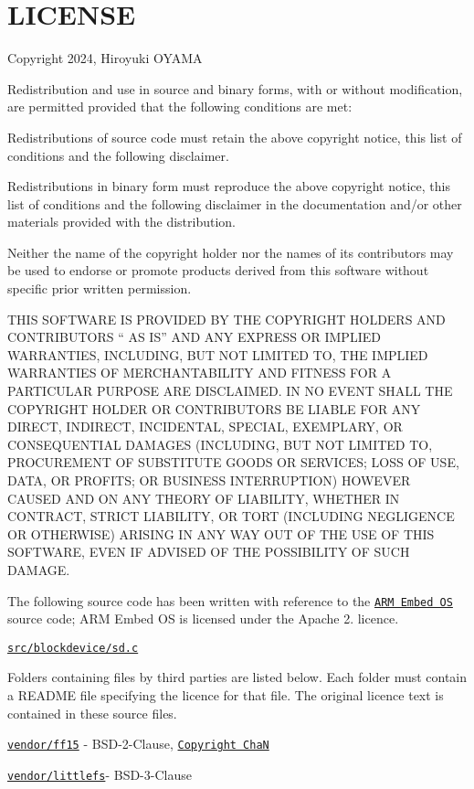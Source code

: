 \chapter{LICENSE }
\hypertarget{md_lib_2pico-vfs-_r_e_g_i-_local_2_l_i_c_e_n_s_e}{}\label{md_lib_2pico-vfs-_r_e_g_i-_local_2_l_i_c_e_n_s_e}
Copyright 2024, Hiroyuki OYAMA

Redistribution and use in source and binary forms, with or without modification, are permitted provided that the following conditions are met\+:


\begin{DoxyItemize}
\item Redistributions of source code must retain the above copyright notice, this list of conditions and the following disclaimer.
\item Redistributions in binary form must reproduce the above copyright notice, this list of conditions and the following disclaimer in the documentation and/or other materials provided with the distribution.
\item Neither the name of the copyright holder nor the names of its contributors may be used to endorse or promote products derived from this software without specific prior written permission.
\end{DoxyItemize}

THIS SOFTWARE IS PROVIDED BY THE COPYRIGHT HOLDERS AND CONTRIBUTORS “ AS IS” AND ANY EXPRESS OR IMPLIED WARRANTIES, INCLUDING, BUT NOT LIMITED TO, THE IMPLIED WARRANTIES OF MERCHANTABILITY AND FITNESS FOR A PARTICULAR PURPOSE ARE DISCLAIMED. IN NO EVENT SHALL THE COPYRIGHT HOLDER OR CONTRIBUTORS BE LIABLE FOR ANY DIRECT, INDIRECT, INCIDENTAL, SPECIAL, EXEMPLARY, OR CONSEQUENTIAL DAMAGES (INCLUDING, BUT NOT LIMITED TO, PROCUREMENT OF SUBSTITUTE GOODS OR SERVICES; LOSS OF USE, DATA, OR PROFITS; OR BUSINESS INTERRUPTION) HOWEVER CAUSED AND ON ANY THEORY OF LIABILITY, WHETHER IN CONTRACT, STRICT LIABILITY, OR TORT (INCLUDING NEGLIGENCE OR OTHERWISE) ARISING IN ANY WAY OUT OF THE USE OF THIS SOFTWARE, EVEN IF ADVISED OF THE POSSIBILITY OF SUCH DAMAGE.

The following source code has been written with reference to the \href{https://github.com/ARMmbed/mbed-os}{\texttt{ARM Embed OS}} source code; ARM Embed OS is licensed under the Apache 2. licence.


\begin{DoxyItemize}
\item \href{src/blockdevice/sd.c}{\texttt{src/blockdevice/sd.\+c}}
\end{DoxyItemize}

Folders containing files by third parties are listed below. Each folder must contain a README file specifying the licence for that file. The original licence text is contained in these source files.


\begin{DoxyItemize}
\item \href{vendor/ff15}{\texttt{vendor/ff15}} -\/ BSD-\/2-\/\+Clause, \href{http://www.elm-chan.org/fsw/ff/doc/appnote.html}{\texttt{Copyright ChaN}}
\item \href{vendor/littlefs}{\texttt{vendor/littlefs}}-\/ BSD-\/3-\/\+Clause 
\end{DoxyItemize}